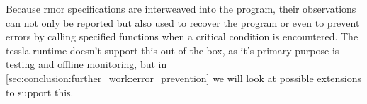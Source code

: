 Because \gls{rmor} specifications are interweaved into the program, their observations can not only be reported but also used to recover the program or even to prevent errors by calling specified functions when a critical condition is encountered.
The \gls{tessla} runtime doesn't support this out of the box, as it's primary purpose is testing and offline monitoring, but in \cref{sec:conclusion:further_work:error_prevention} we will look at possible extensions to support this.


